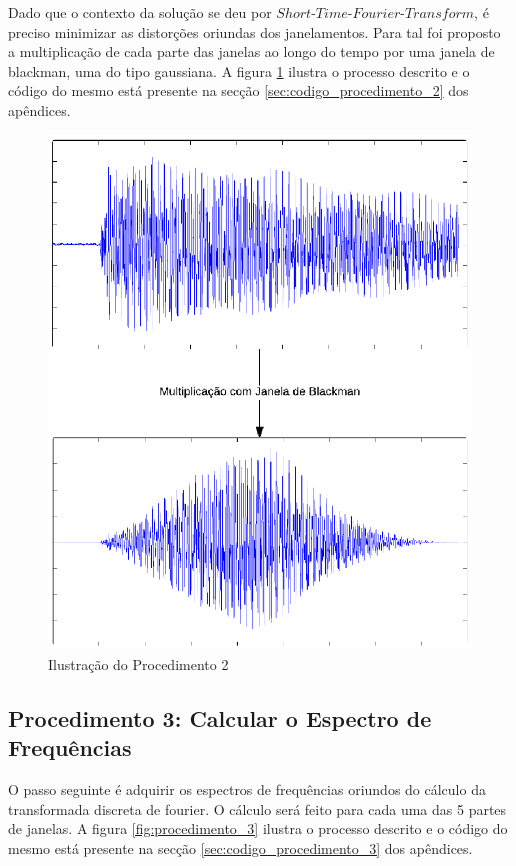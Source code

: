 Dado que o contexto da solução se deu por $Short$-$Time$-$Fourier$-$Transform$, é preciso minimizar as distorções oriundas dos janelamentos. Para tal foi proposto a multiplicação de cada parte das janelas ao longo do tempo por uma janela de blackman, uma do tipo gaussiana. A figura \ref{fig:procedimento_2} ilustra o processo descrito e o código do mesmo está presente na secção \ref{sec:codigo_procedimento_2} dos apêndices.

\begin{figure}[h] 
  \centering
    \includegraphics[keepaspectratio=true, scale=0.7]{figuras/procedimento_2}
    \caption{Ilustração do Procedimento 2}
    \label{fig:procedimento_2}
\end{figure}

\subsection{Procedimento 3: Calcular o Espectro de Frequências}
\label{subsec:procedimento_3}

O passo seguinte é adquirir os espectros de frequências oriundos do cálculo da transformada discreta de fourier. O cálculo será feito para cada uma das 5 partes de janelas. A figura \ref{fig:procedimento_3} ilustra o processo descrito e o código do mesmo está presente na secção \ref{sec:codigo_procedimento_3} dos apêndices.

